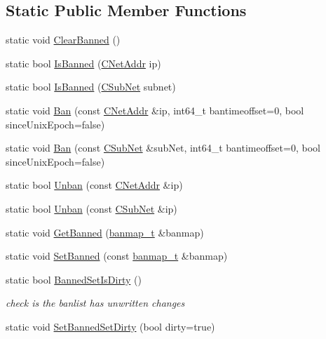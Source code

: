 \subsection*{Static Public Member Functions}
\begin{DoxyCompactItemize}
\item 
static void \mbox{\hyperlink{class_c_node_ad75b43ab81213b74446163211c24246a}{Clear\+Banned}} ()
\item 
static bool \mbox{\hyperlink{class_c_node_aefa8b81afa53b4c6635dc4c6c024211a}{Is\+Banned}} (\mbox{\hyperlink{class_c_net_addr}{C\+Net\+Addr}} ip)
\item 
static bool \mbox{\hyperlink{class_c_node_ad83383fc3ac2c77ce05fa153c65c8f55}{Is\+Banned}} (\mbox{\hyperlink{class_c_sub_net}{C\+Sub\+Net}} subnet)
\item 
static void \mbox{\hyperlink{class_c_node_a6afc79c9c4190f6c8eda1722e86c923d}{Ban}} (const \mbox{\hyperlink{class_c_net_addr}{C\+Net\+Addr}} \&ip, int64\+\_\+t bantimeoffset=0, bool since\+Unix\+Epoch=false)
\item 
static void \mbox{\hyperlink{class_c_node_afc1f11ecdd142e458c7dcb9aa2b2e2db}{Ban}} (const \mbox{\hyperlink{class_c_sub_net}{C\+Sub\+Net}} \&sub\+Net, int64\+\_\+t bantimeoffset=0, bool since\+Unix\+Epoch=false)
\item 
static bool \mbox{\hyperlink{class_c_node_ad182be70ca3fb1acfd50a0a7f04f2960}{Unban}} (const \mbox{\hyperlink{class_c_net_addr}{C\+Net\+Addr}} \&ip)
\item 
static bool \mbox{\hyperlink{class_c_node_ab14e0dfd252421528a303aaad698e700}{Unban}} (const \mbox{\hyperlink{class_c_sub_net}{C\+Sub\+Net}} \&ip)
\item 
static void \mbox{\hyperlink{class_c_node_ac7dc25e8d4c24df89befe4dcc2060372}{Get\+Banned}} (\mbox{\hyperlink{net_8h_af9675d81650e48d20ae495adf73da102}{banmap\+\_\+t}} \&banmap)
\item 
static void \mbox{\hyperlink{class_c_node_a359a988c6d809cf7a4644c263be04d2e}{Set\+Banned}} (const \mbox{\hyperlink{net_8h_af9675d81650e48d20ae495adf73da102}{banmap\+\_\+t}} \&banmap)
\item 
static bool \mbox{\hyperlink{class_c_node_a7c5a22808121ee7a57e46a73eff317c5}{Banned\+Set\+Is\+Dirty}} ()
\begin{DoxyCompactList}\small\item\em check is the banlist has unwritten changes \end{DoxyCompactList}\item 
static void \mbox{\hyperlink{class_c_node_a8937c6802f7f41547a24ac6cecea25b4}{Set\+Banned\+Set\+Dirty}} (bool dirty=true)

\end{DoxyCompactItemize}
